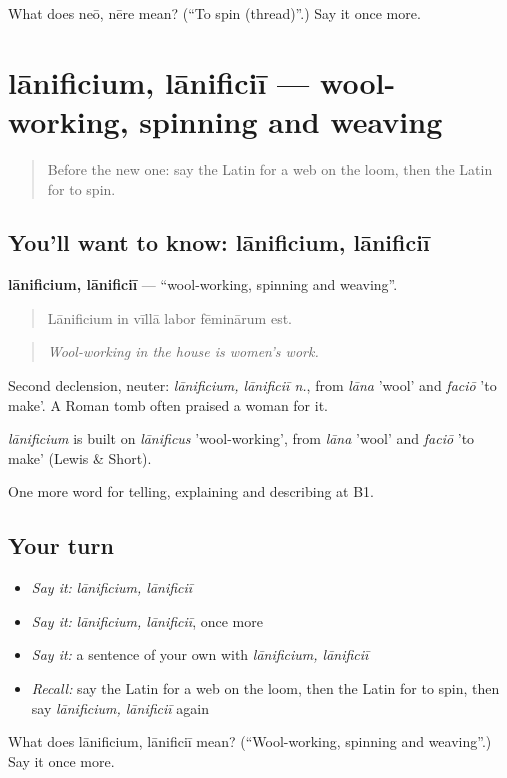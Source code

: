 \begin{tcolorbox}[breakable,colback=teal!4,colframe=teal!35!black,title={Before you move on}]
What does neō, nēre mean? (\textquotedblleft{}To spin (thread)\textquotedblright{}.) Say it once more.
\end{tcolorbox}
\section[lānificium, lānificiī]{lānificium, lānificiī — wool-working, spinning and weaving}

\label{lesson:LA-C472-lanificium}



\begin{quote}
Before the new one: say the Latin for a web on the loom, then the Latin for to spin.
\end{quote}

\subsection*{You'll want to know: lānificium, lānificiī}
\textbf{lānificium, lānificiī} — \textquotedblleft{}wool-working, spinning and weaving\textquotedblright{}.

\begin{quote}
Lānificium in vīllā labor fēminārum est.
\end{quote}

\begin{quote}
\emph{Wool-working in the house is women's work.}
\end{quote}

Second declension, neuter: \emph{lānificium, lānificiī n.}, from \emph{lāna} 'wool' and \emph{faciō} 'to make'. A Roman tomb often praised a woman for it.

\begin{cousinweb}
\emph{lānificium} is built on \emph{lānificus} 'wool-working', from \emph{lāna} 'wool' and \emph{faciō} 'to make' (Lewis \& Short).
\end{cousinweb}

\begin{grammarlens}[title={What you've built}]
One more word for telling, explaining and describing at B1.
\end{grammarlens}

\subsection*{Your turn}
\begin{itemize}
\raggedright
  \item \emph{Say it:} \emph{lānificium, lānificiī}
  \item \emph{Say it:} \emph{lānificium, lānificiī}, once more
  \item \emph{Say it:} a sentence of your own with \emph{lānificium, lānificiī}
  \item \emph{Recall:} say the Latin for a web on the loom, then the Latin for to spin, then say \emph{lānificium, lānificiī} again
\end{itemize}

\begin{tcolorbox}[breakable,colback=teal!4,colframe=teal!35!black,title={Before you move on}]
What does lānificium, lānificiī mean? (\textquotedblleft{}Wool-working, spinning and weaving\textquotedblright{}.) Say it once more.
\end{tcolorbox}
